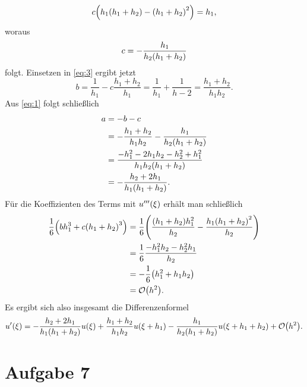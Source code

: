 \documentclass{exercise}
\begin{document}
\begin{enumerate}
        \[
            c\parentheses*{h_1\parentheses*{h_1 + h_2} - \parentheses*{h_1 + h_2}^2} = h_1,
        \]
        woraus
        \[
            c = -\frac{h_1}{h_2\parentheses*{h_1 + h_2}}
        \]
        folgt.
        Einsetzen in \eqref{eq:3} ergibt jetzt
        \[
            b = \frac{1}{h_1} - c\frac{h_1 + h_2}{h_1} = \frac{1}{h_1} + \frac{1}{h-2} = \frac{h_1 + h_2}{h_1 h_2}.
        \]
        Aus \eqref{eq:1} folgt schließlich
        \begin{align*}
            a &= -b - c\\
            &= -\frac{h_1 + h_2}{h_1 h_2} - \frac{h_1}{h_2\parentheses*{h_1 + h_2}}\\
            &= \frac{-h_1^2 - 2h_1 h_2 - h_2^2 + h_1^2}{h_1 h_2\parentheses*{h_1 + h_2}}\\
            &= -\frac{h_2 + 2h_1}{h_1\parentheses*{h_1 + h_2}}.
        \end{align*}
        Für die Koeffizienten des Terms mit \(u'''\parentheses*{\xi}\) erhält man schließlich
        \begin{align*}
            \frac{1}{6}\parentheses*{bh_1^3 + c\parentheses*{h_1 + h_2}^3} &= \frac{1}{6}\parentheses*{\frac{\parentheses*{h_1 + h_2}h_1^2}{h_2} - \frac{h_1\parentheses*{h_1 + h_2}^2}{h_2}}\\
            &= \frac{1}{6}\frac{-h_1^2 h_2 - h_2^2 h_1}{h_2}\\
            &= -\frac{1}{6}\parentheses*{h_1^2 + h_1 h_2}\\
            &= \mathcal{O}\parentheses*{h^2}.
        \end{align*}
        Es ergibt sich also insgesamt die Differenzenformel
        \[
            u'\parentheses*{\xi} = -\frac{h_2 + 2h_1}{h_1\parentheses*{h_1 + h_2}}u\parentheses*{\xi} + \frac{h_1 + h_2}{h_1 h_2}u\parentheses*{\xi + h_1} - \frac{h_1}{h_2\parentheses*{h_1 + h_2}}u\parentheses*{\xi + h_1 + h_2} + \mathcal{O}\parentheses*{h^2}.
        \]
    \end{enumerate}


    \section*{Aufgabe 7}
    
\end{document}
